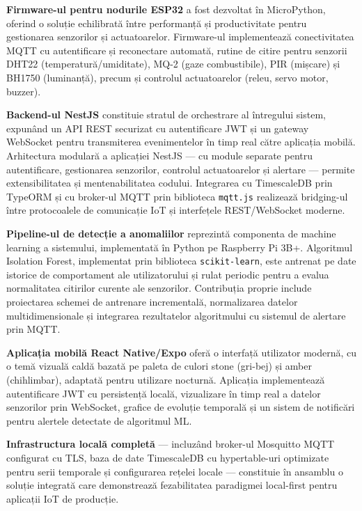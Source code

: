 \documentclass[12pt, twoside, a4paper]{report}
\begin{document}
\textbf{Firmware-ul pentru nodurile ESP32} a fost dezvoltat în MicroPython, oferind
o soluție echilibrată între performanță și productivitate pentru gestionarea senzorilor
și actuatoarelor. Firmware-ul implementează conectivitatea MQTT cu autentificare și
reconectare automată, rutine de citire pentru senzorii DHT22 (temperatură/umiditate),
MQ-2 (gaze combustibile), PIR (mișcare) și BH1750 (luminanță), precum și controlul
actuatoarelor (releu, servo motor, buzzer).

\textbf{Backend-ul NestJS} constituie stratul de orchestrare al întregului sistem,
expunând un API REST securizat cu autentificare JWT și un gateway WebSocket pentru
transmiterea evenimentelor în timp real către aplicația mobilă. Arhitectura modulară a
aplicației NestJS --- cu module separate pentru autentificare, gestionarea senzorilor,
controlul actuatoarelor și alertare --- permite extensibilitatea și mentenabilitatea
codului. Integrarea cu TimescaleDB prin TypeORM și cu broker-ul MQTT prin biblioteca
\texttt{mqtt.js} realizează bridging-ul între protocoalele de comunicație IoT și
interfețele REST/WebSocket moderne.

\textbf{Pipeline-ul de detecție a anomaliilor} reprezintă componenta de machine
learning a sistemului, implementată în Python pe Raspberry Pi 3B+. Algoritmul
Isolation Forest, implementat prin biblioteca \texttt{scikit-learn}, este antrenat pe
date istorice de comportament ale utilizatorului și rulat periodic pentru a evalua
normalitatea citirilor curente ale senzorilor. Contribuția proprie include proiectarea
schemei de antrenare incrementală, normalizarea datelor multidimensionale și integrarea
rezultatelor algoritmului cu sistemul de alertare prin MQTT.

\textbf{Aplicația mobilă React Native/Expo} oferă o interfață utilizator modernă,
cu o temă vizuală caldă bazată pe paleta de culori stone (gri-bej) și amber (chihlimbar),
adaptată pentru utilizare nocturnă. Aplicația implementează autentificare JWT cu
persistență locală, vizualizare în timp real a datelor senzorilor prin WebSocket,
grafice de evoluție temporală și un sistem de notificări pentru alertele detectate de
algoritmul ML.

\textbf{Infrastructura locală completă} --- incluzând broker-ul Mosquitto MQTT
configurat cu TLS, baza de date TimescaleDB cu hypertable-uri optimizate pentru serii
temporale și configurarea rețelei locale --- constituie în ansamblu o soluție integrată
care demonstrează fezabilitatea paradigmei local-first pentru aplicații IoT de producție.
\end{document}
